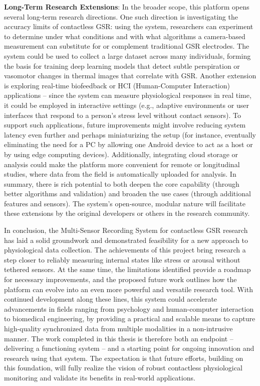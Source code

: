 \textbf{Long-Term Research Extensions}: In the broader scope, this platform opens several long-term research directions. One such direction is investigating the accuracy limits of contactless GSR: using the system, researchers can experiment to determine under what conditions and with what algorithms a camera-based measurement can substitute for or complement traditional GSR electrodes. The system could be used to collect a large dataset across many individuals, forming the basis for training deep learning models that detect subtle perspiration or vasomotor changes in thermal images that correlate with GSR. Another extension is exploring real-time biofeedback or HCI (Human-Computer Interaction) applications -- since the system can measure physiological responses in real time, it could be employed in interactive settings (e.g., adaptive environments or user interfaces that respond to a person's stress level without contact sensors). To support such applications, future improvements might involve reducing system latency even further and perhaps miniaturizing the setup (for instance, eventually eliminating the need for a PC by allowing one Android device to act as a host or by using edge computing devices). Additionally, integrating cloud storage or analysis could make the platform more convenient for remote or longitudinal studies, where data from the field is automatically uploaded for analysis. In summary, there is rich potential to both deepen the core capability (through better algorithms and validation) and broaden the use cases (through additional features and sensors). The system's open-source, modular nature will facilitate these extensions by the original developers or others in the research community.

In conclusion, the Multi-Sensor Recording System for contactless GSR research has laid a solid groundwork and demonstrated feasibility for a new approach to physiological data collection. The achievements of this project bring research a step closer to reliably measuring internal states like stress or arousal without tethered sensors. At the same time, the limitations identified provide a roadmap for necessary improvements, and the proposed future work outlines how the platform can evolve into an even more powerful and versatile research tool. With continued development along these lines, this system could accelerate advancements in fields ranging from psychology and human-computer interaction to biomedical engineering, by providing a practical and scalable means to capture high-quality synchronized data from multiple modalities in a non-intrusive manner. The work completed in this thesis is therefore both an endpoint -- delivering a functioning system -- and a starting point for ongoing innovation and research using that system. The expectation is that future efforts, building on this foundation, will fully realize the vision of robust contactless physiological monitoring and validate its benefits in real-world applications.
